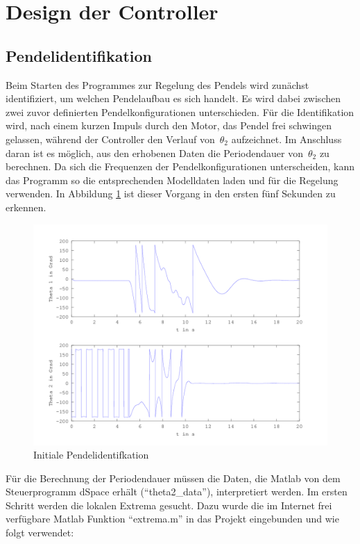 \section{Design der Controller}
\label{sec.Controller}
\subsection{Pendelidentifikation}
\label{Pendelidentifikation}
Beim Starten des Programmes zur Regelung des Pendels wird zunächst identifiziert, um welchen Pendelaufbau es sich handelt. Es wird dabei zwischen zwei zuvor definierten Pendelkonfigurationen unterschieden.
Für die Identifikation wird, nach einem kurzen Impuls durch den Motor, das Pendel frei schwingen gelassen, während der Controller den Verlauf von~$\theta_2$ aufzeichnet. Im Anschluss daran ist es möglich, aus den erhobenen Daten die Periodendauer von~$\theta_2$ zu berechnen. Da sich die Frequenzen der Pendelkonfigurationen unterscheiden, kann das Programm so die entsprechenden Modelldaten laden und für die Regelung verwenden. In Abbildung \ref{fig.Identifikation} ist dieser Vorgang in den ersten fünf Sekunden zu erkennen.

\begin{figure}[htbp]
	\centering	
	\includegraphics[width=1\textwidth]{Grafiken/Swingup_kurz.png}
	\caption{Initiale Pendelidentifkation}
	\label{fig.Identifikation}
\end{figure}

Für die Berechnung der Periodendauer müssen die Daten, die Matlab von dem Steuerprogramm dSpace erhält (``theta2\_data''), interpretiert werden. Im ersten Schritt werden die lokalen Extrema gesucht. Dazu wurde die im Internet frei verfügbare Matlab Funktion ``extrema.m'' in das Projekt eingebunden und wie folgt verwendet:\\

